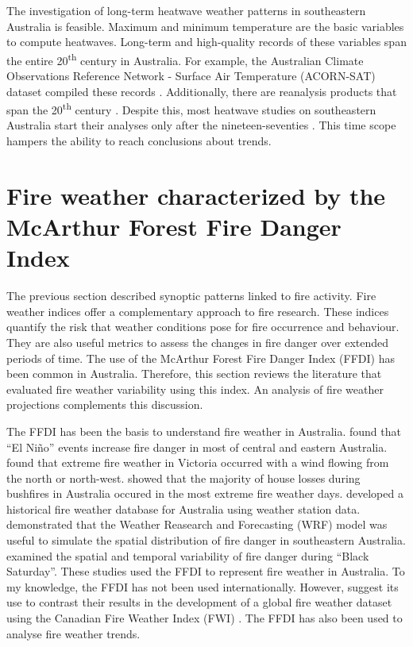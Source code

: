 The investigation of long-term heatwave weather patterns in southeastern
Australia is feasible. Maximum and minimum temperature are the basic
variables to compute heatwaves. Long-term and high-quality records
of these variables span the entire 20\textsuperscript{th} century
in Australia. For example, the Australian Climate Observations Reference
Network - Surface Air Temperature (ACORN-SAT) dataset compiled these
records \citep{Trewin2013}. Additionally, there are reanalysis products
that span the 20\textsuperscript{th} century \citep{Compo2011,Stickler2014}.
Despite this, most heatwave studies on southeastern Australia start
their analyses only after the nineteen-seventies \citep{Pezza2012,Parker2013,Boschat2014,Parker2014a}.
This time scope hampers the ability to reach conclusions about trends. 


\section{Fire weather characterized by the McArthur Forest Fire Danger Index}

The previous section described synoptic patterns linked to fire activity.
Fire weather indices offer a complementary approach to fire research.
These indices quantify the risk that weather conditions pose for fire
occurrence and behaviour. They are also useful metrics to assess the
changes in fire danger over extended periods of time. The use of the
McArthur Forest Fire Danger Index (FFDI) has been common in Australia.
Therefore, this section reviews the literature that evaluated fire
weather variability using this index. An analysis of fire weather
projections complements this discussion.

The FFDI has been the basis to understand fire weather in Australia.
\citet{Williams1999} found that \textquotedblleft El Ni\~no\textquotedblright{}
events increase fire danger in most of central and eastern Australia.
\citet{Long2006} found that extreme fire weather in Victoria occurred
with a wind flowing from the north or north-west. \citet{Blanchi2010}
showed that the majority of house losses during bushfires in Australia
occured in the most extreme fire weather days. \citet{Lucas2010}
developed a historical fire weather database for Australia using weather
station data. \citet{Clarke2013a} demonstrated that the Weather Reasearch
and Forecasting (WRF) model \citep{Skamarock2008} was useful to simulate
the spatial distribution of fire danger in southeastern Australia.
\citet{Engel2013} examined the spatial and temporal variability of
fire danger during ``Black Saturday''. These studies used the FFDI
to represent fire weather in Australia. To my knowledge, the FFDI
has not been used internationally. However, \citet{Field2015} suggest
its use to contrast their results in the development of a global fire
weather dataset using the Canadian Fire Weather Index (FWI) \citep{VanWagner1974}.
The FFDI has also been used to analyse fire weather trends.

